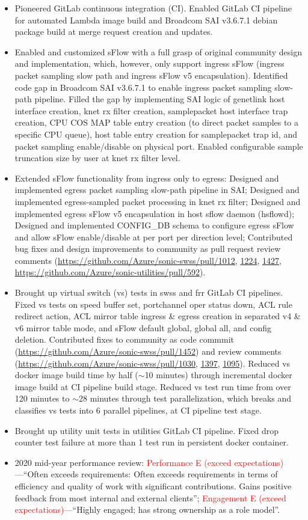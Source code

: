 \documentclass[letterpaper,11pt]{article}
\newcommand{\resitem}[1]{\item #1 \vspace{-2pt}}
\begin{document}
\begin{CJK}{UTF8}{gbsn}
\begin{itemize}
\begin{itemize}
  \resitem{Pioneered GitLab continuous integration (CI). Enabled GitLab CI pipeline for automated Lambda image build
  and Broadcom SAI v3.6.7.1 debian package build at merge request creation and updates.}
  \resitem{Enabled and customized sFlow with a full grasp of original community design and implementation,
  which, however, only support ingress sFlow (ingress packet sampling slow path and ingress sFlow v5 encapsulation).
  Identified code gap in Broadcom SAI v3.6.7.1 to enable ingress packet sampling slow-path pipeline.
  Filled the gap by implementing SAI logic of genetlink host interface creation, knet rx filter creation, samplepacket host interface trap creation,
  CPU COS MAP table entry creation (to direct packet samples to a specific CPU queue), host table entry creation for samplepacket trap id,
  and packet sampling enable/disable on physical port.
  Enabled configurable sample truncation size by user at knet rx filter level.
  }
  \resitem{Extended sFlow functionality from ingress only to egress: Designed and implemented egress packet sampling slow-path pipeline in SAI;
  Designed and implemented egress-sampled packet processing in knet rx filter;
  Designed and implemented egress sFlow v5 encapsulation in host sflow daemon (hsflowd);
  Designed and implemented CONFIG\_DB schema to configure egress sFlow and allow sFlow enable/disable at per port per direction level;
  Contributed bug fixes and design improvements to community as pull request review comments (\url{https://github.com/Azure/sonic-swss/pull/1012},
  \url{1224}, \url{1427},
  \url{https://github.com/Azure/sonic-utilities/pull/592}).}
  \resitem{Brought up virtual switch (vs) tests in swss and frr GitLab CI pipelines.
  Fixed vs tests on speed buffer set, portchannel oper status down, ACL rule redirect action,
  ACL mirror table ingress \& egress creation in separated v4 \& v6 mirror table mode, and sFlow default global, global all, and config deletion.
  Contributed fixes to community as code commmit (\url{https://github.com/Azure/sonic-swss/pull/1452}) and review comments
  (\url{https://github.com/Azure/sonic-swss/pull/1030}, \url{1397}, \url{1095}).
  Reduced vs docker image build time by half ({\tt $\sim$}10 minutes) through incremental docker image build at CI pipeline build stage.
  Reduced vs test run time from over 120 minutes to {\tt $\sim$}28 minutes through test parallelization,
  which breaks and classifies vs tests into 6 parallel pipelines, at CI pipeline test stage.}
  \resitem{Brought up utility unit tests in utilities GitLab CI pipeline.
  Fixed drop counter test failure at more than 1 test run in persistent docker container.}
  \resitem{2020 mid-year performance review: \textcolor{Red}{Performance E (exceed expectations)}---``Often exceeds requirements: Often exceeds requirements
  in terms of efficiency and quality of work with significant contributions. Gains positive feedback from most internal and external clients'';
  \textcolor{Red}{Engagement E (exceed expectations)}---``Highly engaged; has strong ownership as a role model''.}


\end{itemize}
\end{itemize}
\end{CJK}
\end{document}
